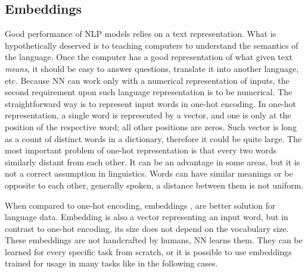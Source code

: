 \subsection{Embeddings}
\label{sec:embedd}
Good performance of NLP models relies on a text representation. What is hypothetically deserved is to teaching computers to understand the semantics of the language. Once the computer has a good representation of what given text \textit{means}, it should be easy to answer questions, translate it into another language, etc. Because NN can work only with a numerical representation of inputs, the second requirement upon such language representation is to be numerical. The straightforward way is to represent input words in one-hot encoding. In one-hot representation, a single word is represented by a vector, and one is only at the position of the respective word; all other positions are zeros. Such vector is long as a count of distinct words in a dictionary, therefore it could be quite large. The most important problem of one-hot representation is that every two words similarly distant from each other. It can be an advantage in some areas, but it is not a correct assumption in linguistics. Words can have similar meanings or be opposite to each other, generally spoken, a distance between them is not uniform.
\par
When compared to one-hot encoding, embeddings  \citep{Bengio2003}, \citep{Ling} are better solution for language data. Embedding is also a vector representing an input word, but in contrast to one-hot encoding, its size does not depend on the vocabulary size. These embeddings are not handcrafted by humans, NN learns them. They can be learned for every specific task from scratch, or it is possible to use embeddings trained for usage in many tasks like in the following cases.

